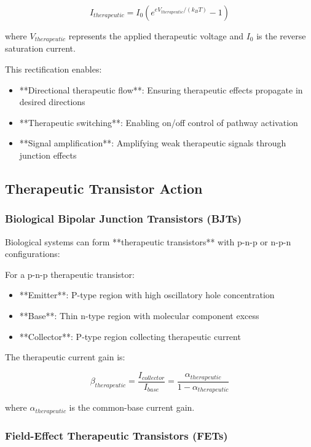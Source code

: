 \begin{equation}
I_{therapeutic} = I_0 \left(e^{eV_{therapeutic}/(k_B T)} - 1\right)
\end{equation}

where $V_{therapeutic}$ represents the applied therapeutic voltage and $I_0$ is the reverse saturation current.

This rectification enables:
\begin{itemize}
\item **Directional therapeutic flow**: Ensuring therapeutic effects propagate in desired directions
\item **Therapeutic switching**: Enabling on/off control of pathway activation
\item **Signal amplification**: Amplifying weak therapeutic signals through junction effects
\end{itemize}

\subsection{Therapeutic Transistor Action}

\subsubsection{Biological Bipolar Junction Transistors (BJTs)}

Biological systems can form **therapeutic transistors** with p-n-p or n-p-n configurations:

For a p-n-p therapeutic transistor:
\begin{itemize}
\item **Emitter**: P-type region with high oscillatory hole concentration
\item **Base**: Thin n-type region with molecular component excess  
\item **Collector**: P-type region collecting therapeutic current
\end{itemize}

The therapeutic current gain is:

\begin{equation}
\beta_{therapeutic} = \frac{I_{collector}}{I_{base}} = \frac{\alpha_{therapeutic}}{1 - \alpha_{therapeutic}}
\end{equation}

where $\alpha_{therapeutic}$ is the common-base current gain.

\subsubsection{Field-Effect Therapeutic Transistors (FETs)}

